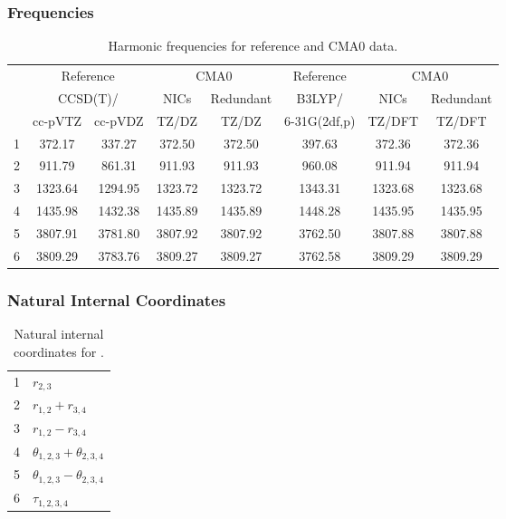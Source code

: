 \documentclass[10pt,oneside]{article}
\begin{document}
\begin{table}[h!]
\subsubsection*{Frequencies}
\centering
\caption{Harmonic frequencies for reference and CMA0 data.}
\begin{tabular}{cccccccc}
\toprule
{} & \multicolumn{2}{c}{Reference} & \multicolumn{2}{c}{CMA0} &    Reference & \multicolumn{2}{c}{CMA0} \\
{} & \multicolumn{2}{c}{CCSD(T)/} &    NICs &  Redundant &       B3LYP/ &    NICs & Redundant \\
{} &   cc-pVTZ & cc-pVDZ &   TZ/DZ &      TZ/DZ & 6-31G(2df,p) &  TZ/DFT &    TZ/DFT \\
\midrule
1 &    372.17 &  337.27 &  372.50 &     372.50 &       397.63 &  372.36 &    372.36 \\
2 &    911.79 &  861.31 &  911.93 &     911.93 &       960.08 &  911.94 &    911.94 \\
3 &   1323.64 & 1294.95 & 1323.72 &    1323.72 &      1343.31 & 1323.68 &   1323.68 \\
4 &   1435.98 & 1432.38 & 1435.89 &    1435.89 &      1448.28 & 1435.95 &   1435.95 \\
5 &   3807.91 & 3781.80 & 3807.92 &    3807.92 &      3762.50 & 3807.88 &   3807.88 \\
6 &   3809.29 & 3783.76 & 3809.27 &    3809.27 &      3762.58 & 3809.29 &   3809.29 \\
\bottomrule
\end{tabular}
\end{table}

\begin{table}[h!]
\subsubsection*{Natural Internal Coordinates}
\centering
\caption{Natural internal coordinates for .}
\small
\begin{tabular}{ll}
\toprule
  1   & $r_{2,3}$ \\
  2   & $r_{1,2} + r_{3,4}$ \\
  3   & $r_{1,2} - r_{3,4}$ \\
  4   & $\theta_{1,2,3} + \theta_{2,3,4}$ \\
  5   & $\theta_{1,2,3} - \theta_{2,3,4}$ \\
  6   & $\tau_{1,2,3,4}$ \\
\bottomrule
\end{tabular}
\end{table}
\end{document}
